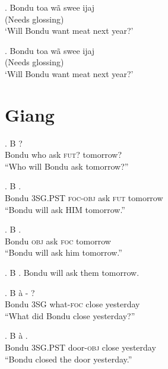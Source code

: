 \documentclass{assets/fieldnotes}
\begin{document}
\exg. Bondu toa wã swee ijaj\\
(Needs glossing)\\
`Will Bondu want meat next year?'

\exg. Bondu toa wã swee ijaj\\
(Needs glossing)\\
`Will Bondu want meat next year?'

\section{Giang}
\exg. B    ?\\
Bondu who ask \textsc{fut?} tomorrow?\\
``Who will Bondu ask tomorrow?''

\exg. B     .\\
Bondu \textsc{3SG.PST} \textsc{foc-obj} ask \textsc{fut} tomorrow\\
``Bondu will ask HIM tomorrow.''

\exg. B    .\\
Bondu \textsc{obj} ask \textsc{foc} tomorrow\\
``Bondu will ask him tomorrow.''\\

\ex. B    .
Bondu will ask them tomorrow.\\


\exg. B \`a -  ?\\
Bondu \textsc{3SG} what-\textsc{foc} close yesterday\\
``What did Bondu close yesterday?''

\exg. B \`a   .\\
Bondu \textsc{3SG.PST} door-\textsc{obj} close yesterday\\
``Bondu closed the door yesterday.''
\end{document}
